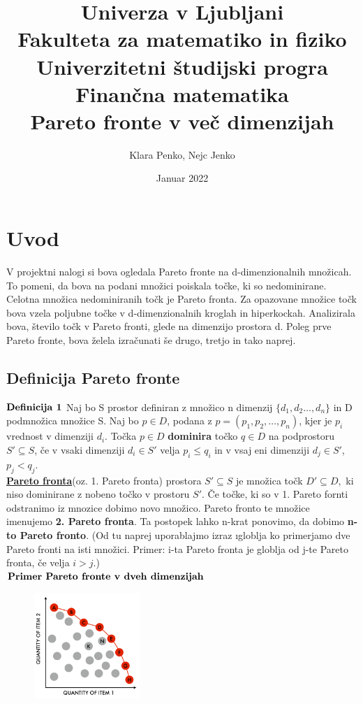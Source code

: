 \documentclass{article}
\title{
{\large{Univerza v Ljubljani}}\\ 
{\large{Fakulteta za matematiko in fiziko}}\\ 
{\large{Univerzitetni študijski progra Finančna matematika}}\\ 
\vspace{5cm}
{\textbf{Pareto fronte v več dimenzijah}
\vspace{5cm}}
}
\author{Klara Penko, Nejc Jenko}
\date{Januar 2022}
\begin{document}
\begin{titlepage}
    \maketitle
\end{titlepage}

\section{Uvod}
V projektni nalogi si bova ogledala Pareto fronte na d-dimenzionalnih množicah. To pomeni, da bova na podani množici poiskala točke, ki so nedominirane. Celotna množica nedominiranih točk je Pareto fronta.  Za opazovane množice točk bova vzela poljubne točke v d-dimenzionalnih kroglah in hiperkockah. Analizirala bova, število točk v Pareto fronti, glede na dimenzijo prostora d. Poleg prve Pareto fronte, bova želela izračunati še drugo, tretjo in tako naprej.


\subsection{Definicija Pareto fronte}
${\rm \textbf{Definicija 1}}$ Naj bo S prostor definiran z množico n dimenzij $\{d_{1},d_{2}\dots,d_{n}\}$ in D podmnožica množice S. Naj bo $p \in D$, podana z $p = (p_{1},p_{2},\dots,p_{n})$, kjer je $p_{i}$ vrednost v dimenziji $d_{i}$. Točka $p \in D$ \textbf{dominira} točko $q \in D$ na podprostoru $S'\subseteq S$, če v vsaki dimenziji $d_{i} \in S'$ velja $p_{i} \le q_{i}$ in v vsaj eni dimenziji $d_{j} \in S'$, $p_{j} < q_{j}$. \\
\underline{\textbf{Pareto fronta}}(oz. 1. Pareto fronta) prostora $S' \subseteq S$ je množica točk $D' \subseteq D,$ ki niso dominirane z nobeno točko v prostoru $S'$. Če točke, ki so v 1. Pareto fornti odstranimo iz mnozice dobimo novo množico. Pareto fronto te množice imenujemo \textbf{2. Pareto fronta}. Ta postopek lahko n-krat ponovimo, da dobimo \textbf{n-to Pareto fronto}.
(Od tu naprej uporablajmo izraz \i{globlja} ko primerjamo dve Pareto fronti na isti množici. Primer: i-ta Pareto fronta je globlja od j-te Pareto fronta, če velja $i > j$.)
\\

${\rm \textbf{Primer Pareto fronte v dveh dimenzijah}}$

\begin{figure}[htbp]
\includegraphics[width=4cm]{Slike/Slika_pareto_fronta.png}
\centering
\end{figure}
\end{document}

